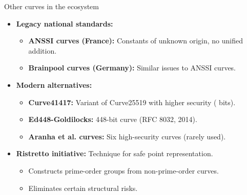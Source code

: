 \documentclass[aspectratio=169, lualatex, handout]{beamer}
\begin{document}
\begin{frame}{Other curves in the ecosystem}
	\begin{itemize}[<+->]
		\item \textbf{Legacy national standards:}
		      \begin{itemize}
			      \item \textbf{ANSSI curves (France):} Constants of unknown origin, no unified addition.
			      \item \textbf{Brainpool curves (Germany):} Similar issues to ANSSI curves.
		      \end{itemize}
		\item \textbf{Modern alternatives:}
		      \begin{itemize}
			      \item \textbf{Curve41417:} Variant of Curve25519 with higher security ( bits).
			      \item \textbf{Ed448-Goldilocks:} 448-bit curve (RFC 8032, 2014).
			      \item \textbf{Aranha et al. curves:} Six high-security curves (rarely used).
		      \end{itemize}
		\item \textbf{Ristretto initiative:} Technique for safe point representation.
		      \begin{itemize}
			      \item Constructs prime-order groups from non-prime-order curves.
			      \item Eliminates certain structural risks.
		      \end{itemize}
	\end{itemize}
\end{frame}
\end{document}
